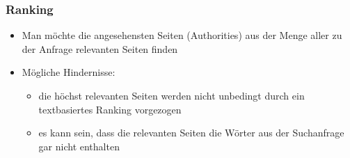 \documentclass[hyperref={pdfpagelabels=false}]{beamer}
\begin{document}
\begin{frame}
\frametitle{Ranking}

\begin{itemize}
\item Man möchte die angesehensten Seiten (Authorities) aus der Menge aller zu der Anfrage relevanten Seiten finden
\item Mögliche Hindernisse:
	\begin{itemize}
	\item die höchst relevanten Seiten werden nicht unbedingt durch ein textbasiertes Ranking vorgezogen
	\item es kann sein,  dass die relevanten Seiten die Wörter aus der Suchanfrage gar nicht enthalten
	\end{itemize}
\end{itemize}
\end{frame}
\end{document}
